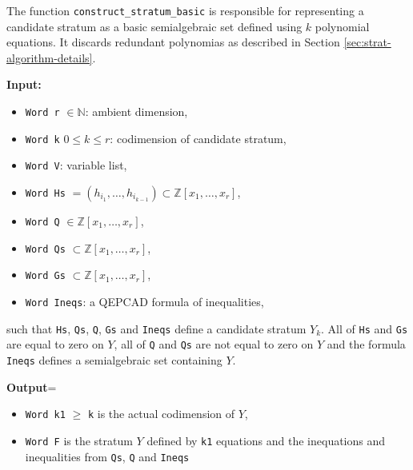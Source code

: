 \documentclass[
]{book}
\providecommand{\tightlist}{%
  \setlength{\itemsep}{0pt}\setlength{\parskip}{0pt}}
\theoremstyle{definition}
\theoremstyle{definition}
\theoremstyle{definition}
\theoremstyle{definition}
\theoremstyle{remark}
\begin{document}
The function \texttt{construct\_stratum\_basic} is responsible for representing a candidate stratum as a basic semialgebraic set defined using \(k\) polynomial equations. It discards redundant polynomias as described in Section \ref{sec:strat-algorithm-details}.

\textbf{Input:}

\begin{itemize}
\tightlist
\item
  \texttt{Word\ r} \(\in \mathbb{N}\): ambient dimension,
\item
  \texttt{Word\ k} \(0 \le k \le r\): codimension of candidate stratum,
\item
  \texttt{Word\ V}: variable list,
\item
  \texttt{Word\ Hs} \(= (h_{i_1},\ldots,h_{i_{k-1}}) \subset \mathbb{Z}[x_1,\ldots,x_r]\),
\item
  \texttt{Word\ Q} \(\in \mathbb{Z}[x_1,\ldots,x_r]\),
\item
  \texttt{Word\ Qs} \(\subset \mathbb{Z}[x_1,\ldots,x_r]\),
\item
  \texttt{Word\ Gs} \(\subset \mathbb{Z}[x_1,\ldots,x_r]\),
\item
  \texttt{Word\ Ineqs}: a QEPCAD formula of inequalities,
\end{itemize}

such that \texttt{Hs}, \texttt{Qs}, \texttt{Q}, \texttt{Gs} and \texttt{Ineqs} define a candidate stratum \(Y_k\). All of \texttt{Hs} and \texttt{Gs} are equal to zero on \(Y\), all of \texttt{Q} and \texttt{Qs} are not equal to zero on \(Y\) and the formula \texttt{Ineqs} defines a semialgebraic set containing \(Y\).

\textbf{Output}=

\begin{itemize}
\tightlist
\item
  \texttt{Word\ k1} \(\ge\) \texttt{k} is the actual codimension of \(Y\),
\item
  \texttt{Word\ F} is the stratum \(Y\) defined by \texttt{k1} equations and the inequations and inequalities from \texttt{Qs}, \texttt{Q} and \texttt{Ineqs}
\end{itemize}
\end{document}

